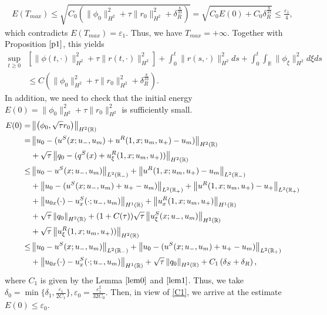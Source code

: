 \documentclass[10pt,reqno]{amsart}
\numberwithin{equation}{section}
\begin{document}
	\begin{align*}
		E(T_{max})\leq \sqrt{C_0\left(\|\phi_0\|_{H^2}^2+\tau\|r_0\|_{H^2}^2 +\delta_R^{\frac{8}{33}}\right)}=\sqrt{C_0E(0)+C_0\delta_{R}^{\frac{8}{33}}}\leq \frac{\varepsilon_1}{4},
	\end{align*}
	which contradicts $E(T_{max})=\varepsilon_1.$ Thus, we have $T_{max}=+\infty$. Together with Proposition $\ref{p1}$, this yields
	\begin{equation} \label{T>0}
		\begin{aligned}
			\sup_{t\geq0 }&\left[\|\phi(t, \cdot)\|_{H^{2}}^2+ \tau\|r(t, \cdot)\|_{H^{2}}^2\right]+ \int_0^t \|r(s, \cdot)\|_{H^{2}}^2 ds + \int_0^t \int_{\mathbb{R}}\|\phi_{\xi}\|_{H^2}^2 d\xi ds \\
			&\leq C \left(\|\phi_0\|_{H^2}^2+\tau\|r_0\|_{H^2}^2 +\delta_R^{\frac{8}{33}}\right).
		\end{aligned}
	\end{equation}
	In addition, we need to check that the initial energy $E(0)=\|\phi_0\|_{H^2}^2+\tau\|r_0\|_{H^2}^2$ is sufficiently small.
	\begin{align*}
		\small
		E(0)=&\left\lVert\left(\phi_0,\sqrt{\tau}r_0\right)\right\rVert_{H^2(\mathbb{R})}\\=&\left\| u_0 - (u^S(x; u_-, u_m) + u^R(1, x; u_m, u_+) - u_m) \right\|_{H^2(\mathbb{R})}\\
		&+\sqrt{\tau}\left\| q_0 - (q^S(x) + u_{\xi}^R(1, x; u_m, u_+)) \right\|_{H^2(\mathbb{R})}\\
		\leq& \left\| u_0 - u^S(x; u_-, u_m) \right\|_{L^2(\mathbb{R}_-)} + \left\| u^R(1, x; u_m, u_+) - u_m \right\|_{L^2(\mathbb{R}_-)}\\
		&+ \left\| u_0 - (u^S(x; u_-, u_m) + u_+ - u_m) \right\|_{L^2(\mathbb{R}_+)} + \left\| u^R(1, x; u_m, u_+) - u_+ \right\|_{L^2(\mathbb{R}_+)}\\
		&+ \left\| u_{0x}(\cdot) - u^S_x(\cdot; u_-, u_m) \right\|_{H^1(\mathbb{R})} + \left\| u^R_x(1, x; u_m, u_+) \right\|_{H^1(\mathbb{R})}\\
		&+\sqrt{\tau}\left\| q_0  \right\|_{H^2(\mathbb{R})}+(1+C(\tau))\sqrt{\tau}\left\| u_{\xi}^S(x;u_-,u_m)\right\|_{H^2(\mathbb{R})}\\
		&+\sqrt{\tau}\left\|u_{\xi}^R(1, x; u_m, u_+)) \right\|_{H^2(\mathbb{R})}\\
		\leq& \left\| u_0 - u^S(x; u_-, u_m) \right\|_{L^2(\mathbb{R}_-)} + \left\| u_0 - (u^S(x; u_-, u_m) + u_+ - u_m) \right\|_{L^2(\mathbb{R}_+)}\\
		&+ \left\| u_{0x}(\cdot) - u^S_x(\cdot; u_-, u_m) \right\|_{H^1(\mathbb{R})} +\sqrt{\tau}\left\| q_0  \right\|_{H^2(\mathbb{R})} +C_1\left( \delta_S+\delta_R\right),
	\end{align*}
	where $C_1$ is given by the Lemma $\ref{lem0}$ and $\ref{lem1}$. Thus, we take $\delta_{0}=\min\{\delta_{1},\frac{\varepsilon_{1}}{2C_1}\},\varepsilon_{0}=\frac{\varepsilon_{1}^2}{32C_0}$. Then, in view of \eqref{C1}, we arrive at the estimate $E(0)\leq \varepsilon_0$.
	
\end{document}
